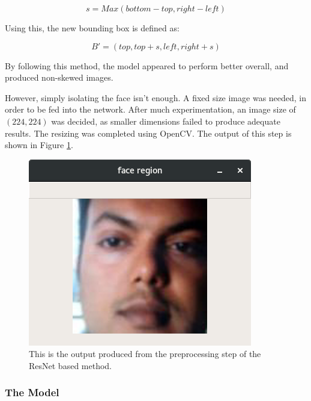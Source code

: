 \documentclass[10pt,a4paper]{article}
\begin{document}
                $$s = Max(bottom - top, right - left)$$


                Using this, the new bounding box is defined as:


                $$B' = (top, top + s, left, right + s)$$


                By following this method, the model appeared to perform better overall, and produced non-skewed images.

                However, simply isolating the face isn't enough. A fixed size image was needed, in order to be fed into the network. After much experimentation, an image size of $(224, 224)$
                was decided, as smaller dimensions failed to produce adequate results. The resizing was completed using OpenCV. The output of this step is shown in Figure \ref{FaceExtraction}.

                \begin{figure}
                    \centering
                    \includegraphics[width=.5\linewidth]{FaceExtraction.png}
                    \caption{This is the output produced from the preprocessing step of the ResNet based method.}
                    \label{FaceExtraction}
                \end{figure}
                
            \subsubsection{The Model}
                    
\end{document}
